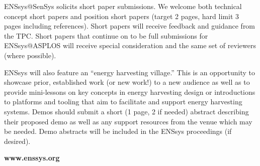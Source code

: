 \documentclass[a4paper,10pt]{scrartcl}
\begin{document}
ENSsys@SenSys solicits short paper submissions.
We welcome both technical concept short papers and position short papers (target 2 pages, hard limit 3 pages including references).
%
Short papers will receive feedback and guidance from the TPC.
%
Short papers that continue on to be full submissions for ENSsys@ASPLOS will receive
special consideration and the same set of reviewers (where possible).
%

\smallskip

ENSsys will also feature an ``energy harvesting village.''
%
This is an opportunity to showcase prior, established work (or new work!) to a new audience
as well as to provide mini-lessons on key concepts in energy harvesting design
or introductions to platforms and tooling that aim to facilitate and support
energy harvesting systems.
%
Demos should submit a short (1 page, 2 if needed) abstract describing their proposed demo as well as any support resources from the venue which may be needed.
%
Demo abstracts will be included in the ENSsys proceedings (if desired).

\begin{center}
  \Huge\bfseries\textcolor{cfp_darkcolor}{www.enssys.org}
\end{center}

\end{document}
